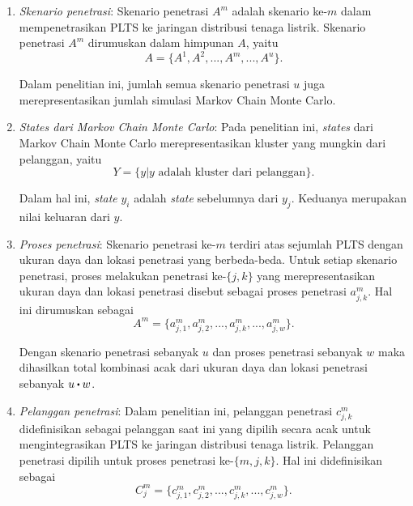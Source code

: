 \begin{enumerate}
    \item \textit{Skenario penetrasi}:
    Skenario penetrasi $A^m$ adalah skenario ke-$m$ dalam mempenetrasikan PLTS ke jaringan distribusi tenaga listrik. Skenario penetrasi $A^m$ dirumuskan dalam himpunan $A$, yaitu
    \begin{equation}\label{pas1}
    A=\{A^1,A^2,...,A^m,...,A^u\}.
    \end{equation}
    
    Dalam penelitian ini, jumlah semua skenario penetrasi $u$ juga merepresentasikan jumlah simulasi Markov Chain Monte Carlo.
    
    \item \textit{States dari Markov Chain Monte Carlo}:
    Pada penelitian ini, \textit{states} dari Markov Chain Monte Carlo merepresentasikan kluster yang mungkin dari pelanggan, yaitu
    \begin{equation}\label{smc1}
    Y=\{y|y \text{ adalah kluster dari pelanggan}\}.
    \end{equation} 
    
    Dalam hal ini, \textit{state} $y_i$ adalah \textit{state} sebelumnya dari $y_j$. Keduanya merupakan nilai keluaran dari $y$.
    
    \item \textit{Proses penetrasi}:
    Skenario penetrasi ke-$m$ terdiri atas sejumlah PLTS dengan ukuran daya dan lokasi penetrasi yang berbeda-beda. Untuk setiap skenario penetrasi, proses melakukan penetrasi ke-$\{j,k\}$ yang merepresentasikan ukuran daya dan lokasi penetrasi disebut sebagai proses penetrasi $a^m_{j,k}$. Hal ini dirumuskan sebagai
    \begin{equation}\label{pas2}
    A^m=\{a^m_{j,1},a^m_{j,2},...,a^m_{j,k},...,a^m_{j,w}\}.
    \end{equation} 
    
    Dengan skenario penetrasi sebanyak $u$ dan proses penetrasi sebanyak $w$ maka dihasilkan total kombinasi acak dari ukuran daya dan lokasi penetrasi sebanyak $u\bigcdot w$.
    
    \item \textit{Pelanggan penetrasi}:
    Dalam penelitian ini, pelanggan penetrasi $c^m_{j,k}$ didefinisikan sebagai pelanggan saat ini yang dipilih secara acak untuk mengintegrasikan PLTS ke jaringan distribusi tenaga listrik. Pelanggan penetrasi dipilih untuk proses penetrasi ke-$\{m,j,k\}$. Hal ini didefinisikan sebagai
    \begin{equation}\label{cpv1}
    \mathit{C^m_j}=\{c^m_{j,1},c^m_{j,2},...,c^m_{j,k},...,c^m_{j,w}\}.
    \end{equation}
    

\end{enumerate}
